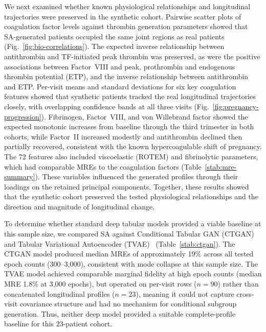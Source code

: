 We next examined whether known physiological relationships and longitudinal
trajectories were preserved in the synthetic cohort. Pairwise scatter plots of
coagulation factor levels against thrombin generation parameters showed that
SA-generated patients occupied the same joint regions as real patients
(Fig.~\ref{fig:bio-correlations}). The expected inverse relationship between
antithrombin and TF-initiated peak thrombin was preserved, as were the positive
associations between Factor~VIII and peak, prothrombin and endogenous thrombin
potential (ETP), and the inverse relationship between antithrombin and ETP.
Per-visit means and standard deviations for six key coagulation features showed
that synthetic patients tracked the real longitudinal trajectories closely, with
overlapping confidence bands at all three visits
(Fig.~\ref{fig:pregnancy-progression}). Fibrinogen, Factor~VIII, and von Willebrand
factor showed the expected monotonic increases from baseline through the third
trimester in both cohorts, while Factor~II increased modestly and antithrombin
declined then partially recovered, consistent with the known hypercoagulable shift
of pregnancy. The 72 features also included viscoelastic (ROTEM) and fibrinolytic
parameters, which had comparable MREs to the coagulation factors
(Table~\ref{stab:mre-summary}). These variables influenced the generated profiles
through their loadings on the retained principal components. Together, these results
showed that the synthetic cohort preserved the tested physiological relationships and
the direction and magnitude of longitudinal change.

To determine whether standard deep tabular models provided a viable baseline at this sample
size, we compared SA against Conditional Tabular GAN (CTGAN) and Tabular Variational Autoencoder
(TVAE)~\citep{Xu2019CTGAN} (Table~\ref{stab:ctgan}). The CTGAN model produced median
MREs of approximately 19\% across all tested epoch counts (300--3,000), consistent with
mode collapse at this sample size. The TVAE model achieved comparable marginal fidelity at
high epoch counts (median MRE
1.8\% at 3,000 epochs), but operated on per-visit rows ($n{=}90$) rather than
concatenated longitudinal profiles ($n{=}23$), meaning it could not capture cross-visit
covariance structure and had no mechanism for conditional subgroup generation. Thus, neither
deep model provided a suitable complete-profile baseline for this $23$-patient cohort.


